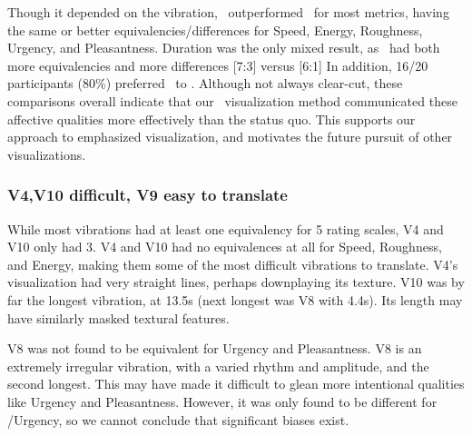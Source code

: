 	Though it depended on the vibration, \linear\ outperformed \original\ for most metrics, having the same or better equivalencies/differences for Speed, Energy, Roughness, Urgency, and Pleasantness.
	Duration was the only mixed result, as \original\ had both more equivalencies and more differences  [7:3] versus [6:1]
    In addition, 16/20 participants (80\%) preferred \linear\ to \original.
    Although not always clear-cut, these comparisons overall indicate that our \linear\ visualization method communicated these %
    affective qualities more effectively than the status quo.
    This supports our approach to emphasized visualization, and motivates the future pursuit of other visualizations.
    
    \subsubsection{V4,V10 difficult, V9 easy to translate}
    
    While most vibrations had at least one equivalency for 5 rating scales, V4 and V10 only had 3.
    V4 and V10 had no equivalences at all for Speed, Roughness, and Energy, making them some of the most difficult vibrations to translate.
    V4's visualization had very straight lines, perhaps downplaying its texture.
    V10 was by far the longest vibration, at 13.5s (next longest was V8 with 4.4s).
    Its length may have similarly masked textural features.
    
    V8 was not found to be equivalent for Urgency and Pleasantness.
    V8 is an extremely irregular vibration, with a varied rhythm and amplitude, and the second longest.
    This may have made it difficult to glean more intentional qualities like Urgency and Pleasantness.
    However, it was only found to be different for \original/Urgency, so we cannot conclude that significant biases exist.
    
